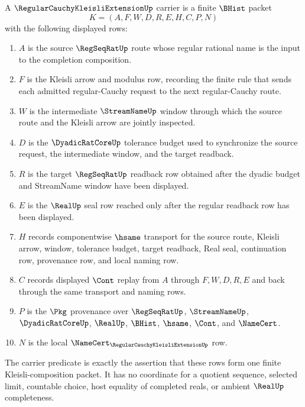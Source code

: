 \begin{definition}
\label{def:regular-cauchy-kleisli-extension-carrier}
A $\RegularCauchyKleisliExtensionUp$ carrier is a finite $\BHist$ packet
$$
K=(A,F,W,D,R,E,H,C,P,N)
$$
with the following displayed rows:
\begin{enumerate}
\item $A$ is the source $\RegSeqRatUp$ route whose regular rational name is the input to the completion composition.
\item $F$ is the Kleisli arrow and modulus row, recording the finite rule that sends each admitted regular-Cauchy request to the next regular-Cauchy route.
\item $W$ is the intermediate $\StreamNameUp$ window through which the source route and the Kleisli arrow are jointly inspected.
\item $D$ is the $\DyadicRatCoreUp$ tolerance budget used to synchronize the source request, the intermediate window, and the target readback.
\item $R$ is the target $\RegSeqRatUp$ readback row obtained after the dyadic budget and StreamName window have been displayed.
\item $E$ is the $\RealUp$ seal row reached only after the regular readback row has been displayed.
\item $H$ records componentwise $\hsame$ transport for the source route, Kleisli arrow, window, tolerance budget, target readback, Real seal, continuation row, provenance row, and local naming row.
\item $C$ records displayed $\Cont$ replay from $A$ through $F,W,D,R,E$ and back through the same transport and naming rows.
\item $P$ is the $\Pkg$ provenance over $\RegSeqRatUp$, $\StreamNameUp$, $\DyadicRatCoreUp$, $\RealUp$, $\BHist$, $\hsame$, $\Cont$, and $\NameCert$.
\item $N$ is the local $\NameCert_{\RegularCauchyKleisliExtensionUp}$ row.
\end{enumerate}
The carrier predicate is exactly the assertion that these rows form one finite Kleisli-composition packet. It has no coordinate for a quotient sequence, selected limit, countable choice, host equality of completed reals, or ambient $\RealUp$ completeness.
\end{definition}

